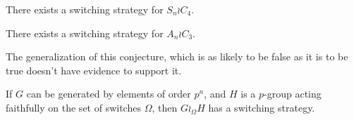 \begin{conjecture}
  There exists a switching strategy for $S_n \wr C_4$.
\end{conjecture}

\begin{conjecture}
  There exists a switching strategy for $A_n \wr C_3$.
\end{conjecture}

The generalization of this conjecture, which is as likely to be false as it is
to be true doesn't have evidence to support it.
\begin{conjecture}
  If $G$ can be generated by elements of order $p^n$, and $H$ is a $p$-group
  acting faithfully on the set of switches $\Omega$, then $G \wr_\Omega H$ has
  a switching strategy.
\end{conjecture}
